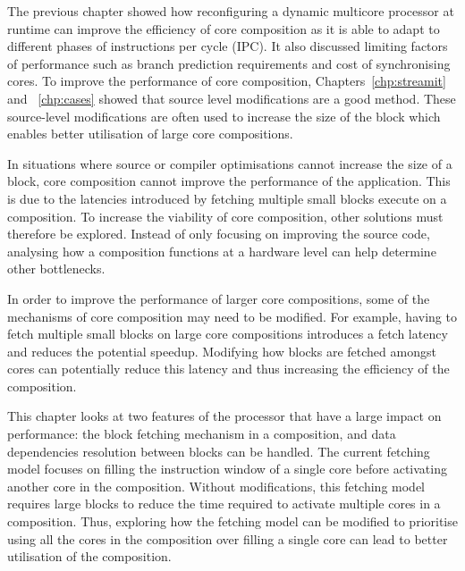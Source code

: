 The previous chapter showed how reconfiguring a dynamic multicore processor at runtime can improve the efficiency of core composition as it is able to adapt to different phases of instructions per cycle (IPC).
It also discussed limiting factors of performance such as branch prediction requirements and cost of synchronising cores.
To improve the performance of core composition, Chapters~\ref{chp:streamit} and ~\ref{chp:cases} showed that source level modifications are a good method.
These source-level modifications are often used to increase the size of the block which enables better utilisation of large core compositions.

In situations where source or compiler optimisations cannot increase the size of a block, core composition cannot improve the performance of the application.
This is due to the latencies introduced by fetching multiple small blocks execute on a composition.
To increase the viability of core composition, other solutions must therefore be explored.
Instead of only focusing on improving the source code, analysing how a composition functions at a hardware level can help determine other bottlenecks.

In order to improve the performance of larger core compositions, some of the mechanisms of core composition may need to be modified.%
For example, having to fetch multiple small blocks on large core compositions introduces a fetch latency and reduces the potential speedup.
Modifying how blocks are fetched amongst cores can potentially reduce this latency and thus increasing the efficiency of the composition.

This chapter looks at two features of the processor that have a large impact on performance: the block fetching mechanism in a composition, and data dependencies resolution between blocks can be handled.
The current fetching model focuses on filling the instruction window of a single core before activating another core in the composition.
Without modifications, this fetching model requires large blocks to reduce the time required to activate multiple cores in a composition.
Thus, exploring how the fetching model can be modified to prioritise using all the cores in the composition over filling a single core can lead to better utilisation of the composition.

